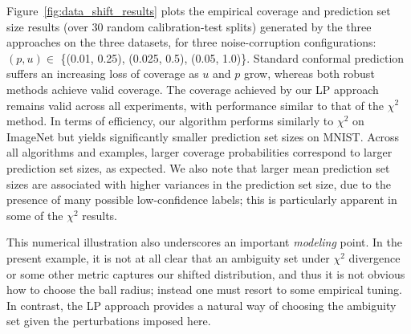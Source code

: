 \documentclass[11pt,a4paper]{article}
\begin{document}
Figure~\ref{fig:data_shift_results} plots the empirical coverage and prediction set size results (over 30 random calibration-test splits) generated by the three approaches on the three datasets, for three noise-corruption configurations: $(p,u) \in$ \{(0.01, 0.25), (0.025, 0.5), (0.05, 1.0)\}. Standard conformal prediction suffers an increasing loss of coverage as $u$ and $p$ grow, whereas both robust methods achieve valid coverage. 
%
The coverage achieved by our LP approach remains valid across all experiments, with performance similar to that of the $\chi^2$ method. 
%
In terms of efficiency, our algorithm performs similarly to $\chi^2$ on ImageNet but yields significantly smaller prediction set sizes on MNIST. 
%
Across all algorithms and examples, larger coverage probabilities correspond to larger prediction set sizes, as expected. We also note that larger mean prediction set sizes are associated with higher variances in the prediction set size, due to the presence of many possible low-confidence labels; this is particularly apparent in some of the $\chi^2$ results.

This numerical illustration also underscores an important \emph{modeling} point. In the present example, it is not at all clear that an ambiguity set under $\chi^2$ divergence or some other metric captures our shifted distribution, and thus it is not obvious how to choose the ball radius; instead one must resort to some empirical tuning. In contrast, the LP approach provides a natural way of choosing the ambiguity set given the perturbations imposed here.

%


%

\end{document}
